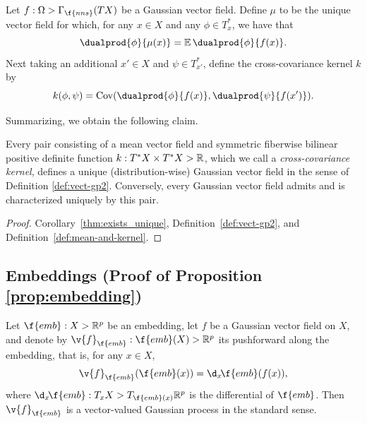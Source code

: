 \begin{definition}
	\label{def:mean-and-kernel}
	Let $f : \Omega \-> \Gamma_{\f{nns}}(TX)$ be a Gaussian vector field.
	Define $\mu$ to be the unique vector field for which, for any $x \in X$ and any $\phi \in T^*_{x}$, we have that \[ \dualprod{\phi}{\mu(x)} = \E \dualprod{\phi}{f(x)} .
	\]
	Next taking an additional $x' \in X$ and $\psi \in T^*_{x'}$, define the cross-covariance kernel $k$ by
	\[
		k(\phi,\psi) = \Cov(\dualprod{\phi}{f(x)},\dualprod{\psi}{f(x')})
		.
	\]
\end{definition}

Summarizing, we obtain the following claim.

\begin{theorem}
	Every pair consisting of a mean vector field and symmetric fiberwise bilinear positive definite function $k : T^*X \times T^*X \-> \mathbb{R}$, which we call a \emph{cross-covariance kernel}, defines a unique (distribution-wise) Gaussian vector field in the sense of Definition \ref{def:vect-gp2}.
	Conversely, every Gaussian vector field admits and is characterized uniquely by this pair.
\end{theorem}

\begin{proof}
	Corollary~\ref{thm:exists_unique}, Definition~\ref{def:vect-gp2}, and Definition~\ref{def:mean-and-kernel}.
\end{proof}

\subsection*{Embeddings (Proof of Proposition \ref{prop:embedding})}

\begin{proposition}
	Let $\f{emb} : X \-> \R^p$ be an embedding, let $f$ be a Gaussian vector field on $X$, and denote by $\v{f}_{\f{emb}} : \f{emb}(X) \-> \R^p$ its pushforward along the embedding, that is, for any $x \in X$,
	\[
		\v{f}_{\f{emb}}(\f{emb}(x)) = \d_x\!\f{emb}(f(x)),
	\]
	where $\d_x\!\f{emb} : T_x X \-> T_{\f{emb}(x)} \R^p$ is the differential of $\f{emb}$.
	Then $\v{f}_{\f{emb}}$ is a vector-valued Gaussian process in the standard sense.
\end{proposition}

